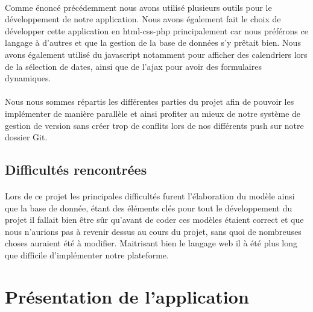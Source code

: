 \documentclass[a4paper, 12pt]{article}
\begin{document}
\paragraph{}Comme énoncé précédemment nous avons utilisé plusieurs outils pour le développement de notre application. Nous avons également fait le choix de développer cette application en html-css-php principalement car nous préférons ce langage à d'autres et que la gestion de la base de données s'y prêtait bien. Nous avons également utilisé du javascript notamment pour afficher des calendriers lors de la sélection de dates, ainsi que de l'ajax pour avoir des formulaires dynamiques.
\paragraph{}Nous nous sommes répartis les différentes parties du projet afin de pouvoir les implémenter de manière parallèle et ainsi profiter au mieux de notre système de gestion de version sans créer trop de conflits lors de nos différents push sur notre dossier Git.

\newpage
\subsection{Difficultés rencontrées}
\paragraph{}Lors de ce projet les principales difficultés furent l'élaboration du modèle ainsi que la base de donnée, étant des éléments clés pour tout le développement du projet il fallait bien être sûr qu'avant de coder ces modèles étaient correct et que nous n'aurions pas à revenir dessus au cours du projet, sans quoi de nombreuses choses auraient été à modifier. Maitrisant bien le langage web il à été plus long que difficile d'implémenter notre plateforme.

\newpage

\section{Présentation de l'application}
\end{document}
